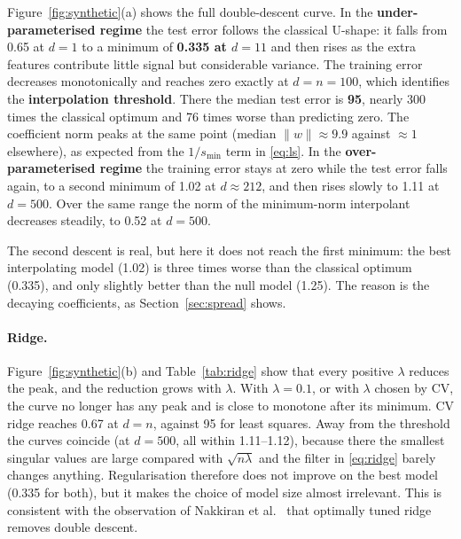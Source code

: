 \documentclass[10pt,a4paper]{article}
\newcommand{\norm}[1]{\lVert #1 \rVert}
\begin{document}
Figure~\ref{fig:synthetic}(a) shows the full double-descent curve. In the \textbf{under-parameterised regime} the test error follows the classical U-shape: it falls from 0.65 at $d=1$ to a minimum of \textbf{0.335 at $d=11$} and then rises as the extra features contribute little signal but considerable variance. The training error decreases monotonically and reaches zero exactly at $d=n=100$, which identifies the \textbf{interpolation threshold}. There the median test error is \textbf{95}, nearly 300 times the classical optimum and 76 times worse than predicting zero. The coefficient norm peaks at the same point (median $\norm{w}\approx 9.9$ against $\approx1$ elsewhere), as expected from the $1/s_{\min}$ term in \eqref{eq:ls}. In the \textbf{over-parameterised regime} the training error stays at zero while the test error falls again, to a second minimum of 1.02 at $d\approx212$, and then rises slowly to 1.11 at $d=500$. Over the same range the norm of the minimum-norm interpolant decreases steadily, to 0.52 at $d=500$.

The second descent is real, but here it does not reach the first minimum: the best interpolating model (1.02) is three times worse than the classical optimum (0.335), and only slightly better than the null model (1.25). The reason is the decaying coefficients, as Section~\ref{sec:spread} shows.

\paragraph{Ridge.} Figure~\ref{fig:synthetic}(b) and Table~\ref{tab:ridge} show that every positive $\lambda$ reduces the peak, and the reduction grows with $\lambda$. With $\lambda=0.1$, or with $\lambda$ chosen by CV, the curve no longer has any peak and is close to monotone after its minimum. CV ridge reaches 0.67 at $d=n$, against 95 for least squares. Away from the threshold the curves coincide (at $d=500$, all within 1.11--1.12), because there the smallest singular values are large compared with $\sqrt{n\lambda}$ and the filter in \eqref{eq:ridge} barely changes anything. Regularisation therefore does not improve on the best model (0.335 for both), but it makes the choice of model size almost irrelevant. This is consistent with the observation of Nakkiran et al.~\cite{nakkiran2021} that optimally tuned ridge removes double descent.
\end{document}
